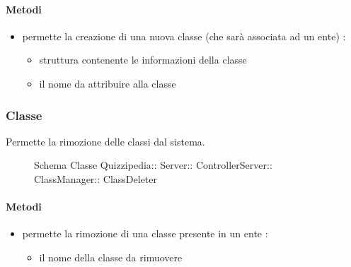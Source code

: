 \paragraph{Metodi}
\begin{itemize}
\item {}
\newline
permette la creazione di una nuova classe (che sarà associata ad un ente)
\newline
{} :
\begin{itemize}
\item {}
\newline
struttura contenente le informazioni della classe
\item {}
\newline
il nome da attribuire alla classe
\end{itemize}
\end{itemize}
\subsubsection{Classe }
Permette la rimozione delle classi dal sistema.
\begin{figure}[H]
\centering
\noindent{}
\caption[Schema Classe ClassDeleter]{Schema Classe Quizzipedia:: Server:: ControllerServer:: ClassManager:: ClassDeleter}
\end{figure}
\paragraph{Metodi}
\begin{itemize}
\item {}
\newline
permette la rimozione di una classe presente in un ente
\newline
{} :
\begin{itemize}
\item {}
\newline
il nome della classe da rimuovere
\end{itemize}
\end{itemize}
